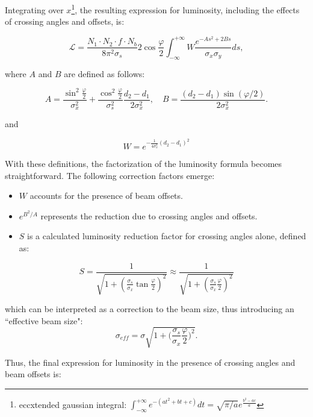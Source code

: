 Integrating over \(x\)\footnote{eccxtended gaussian integral: $\int_{-\infty}^{+\infty}e^{-(at^2+bt+c)}dt = \sqrt{\pi/a}e^{\frac{b^2-ac}{a}}$}, the resulting expression for luminosity, including the effects of crossing angles and offsets, is:

\begin{equation}
\mathcal{L} = \frac{N_1 \cdot N_2 \cdot f \cdot N_b}{8 \pi^2 \sigma_s} 2\cos\frac{\varphi}{2} \int_{-\infty}^{+\infty}W \frac{e^{-As^2 + 2Bs}}{\sigma_x\sigma_y}ds,
\end{equation}

where \(A\) and \(B\) are defined as follows:

\begin{equation}
A = \frac{\sin^2\frac{\varphi}{2}}{\sigma_x^2} + \frac{\cos^2\frac{\varphi}{2}}{\sigma_s^2} \frac{d_2 - d_1}{2 \sigma_x^2}, \quad
B = \frac{(d_2 - d_1)\sin(\varphi/2)}{2 \sigma_x^2}.
\end{equation}

and 

\begin{equation}
    W = e^{-\frac{1}{4\sigma_x^2}(d_2-d_1)^2}
\end{equation}

With these definitions, the factorization of the luminosity formula becomes straightforward. The following correction factors emerge:
\begin{itemize}
\item $W$ accounts for the presence of beam offsets.
\item $e^{B^2/A}$ represents the reduction due to crossing angles and offsets.
\item $S$ is a calculated luminosity reduction factor for crossing angles alone, defined as:
\end{itemize}

\begin{equation}
  S = \frac{1}{\sqrt{1 + \left( \frac{\sigma_s}{\sigma_x} \tan \frac{\varphi}{2} \right)^2}} \approx \frac{1}{\sqrt{1 + \left( \frac{\sigma_s}{\sigma_x} \frac{\varphi}{2} \right)^2}}
\end{equation}

which can be interpreted as a correction to the beam size, thus introducing an ``effective beam size":
\begin{equation}
    \sigma_{eff} = \sigma \sqrt{1+\biggl(\frac{\sigma_s}{\sigma_x}\frac{\varphi}{2}\biggr)^2}.
\end{equation}

Thus, the final expression for luminosity in the presence of crossing angles and beam offsets is:

